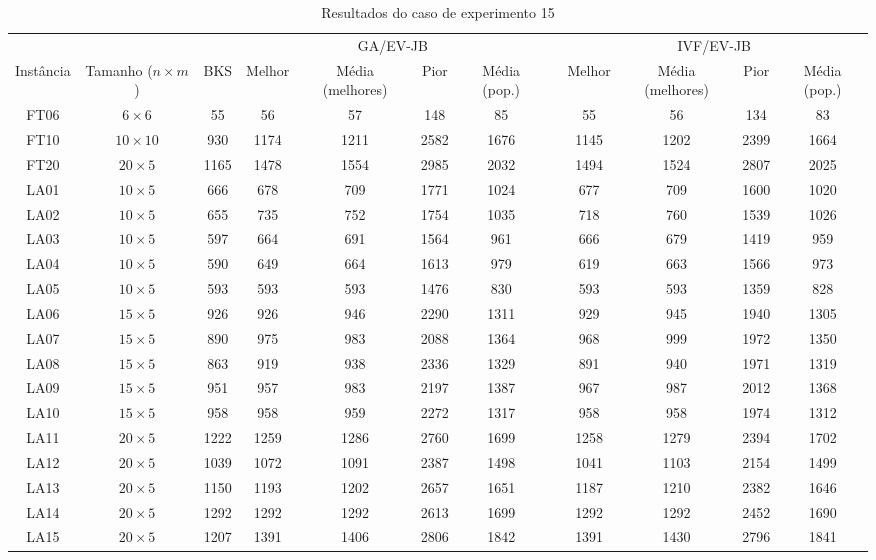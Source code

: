 \begin{sidewaystable}
\caption{Resultados do caso de experimento 15}
\centering
\label{experimento15}
\begin{tabular}{cccccccccccc}
\toprule
& & & \multicolumn{4}{c}{GA/EV-JB} & & \multicolumn{4}{c}{IVF/EV-JB} \\
\cmidrule(c){4-7}
\cmidrule(c){9-12}
Inst\^{a}ncia & Tamanho ($n \times m$) & BKS & Melhor & M\'{e}dia (melhores) & Pior & M\'{e}dia (pop.) & & Melhor & M\'{e}dia (melhores) & Pior & M\'{e}dia (pop.) \\
\midrule
FT06 & $6 \times 6$ & 55 & 56 & 57 & 148 & 85 & & 55 & 56 & 134 & 83 \\
FT10 & $10 \times 10$ & 930 & 1174 & 1211 & 2582 & 1676 & & 1145 & 1202 & 2399 & 1664 \\
FT20 & $20 \times 5$ & 1165 & 1478 & 1554 & 2985 & 2032 & & 1494 & 1524 & 2807 & 2025 \\
LA01 & $10 \times 5$ & 666 & 678 & 709 & 1771 & 1024 & & 677 & 709 & 1600 & 1020 \\
LA02 & $10 \times 5$ & 655 & 735 & 752 & 1754 & 1035 & & 718 & 760 & 1539 & 1026 \\
LA03 & $10 \times 5$ & 597 & 664 & 691 & 1564 & 961 & & 666 & 679 & 1419 & 959 \\
LA04 & $10 \times 5$ & 590 & 649 & 664 & 1613 & 979 & & 619 & 663 & 1566 & 973 \\
LA05 & $10 \times 5$ & 593 & 593 & 593 & 1476 & 830 & & 593 & 593 & 1359 & 828 \\
LA06 & $15 \times 5$ & 926 & 926 & 946 & 2290 & 1311 & & 929 & 945 & 1940 & 1305 \\
LA07 & $15 \times 5$ & 890 & 975 & 983 & 2088 & 1364 & & 968 & 999 & 1972 & 1350 \\
LA08 & $15 \times 5$ & 863 & 919 & 938 & 2336 & 1329 & & 891 & 940 & 1971 & 1319 \\
LA09 & $15 \times 5$ & 951 & 957 & 983 & 2197 & 1387 & & 967 & 987 & 2012 & 1368 \\
LA10 & $15 \times 5$ & 958 & 958 & 959 & 2272 & 1317 & & 958 & 958 & 1974 & 1312 \\
LA11 & $20 \times 5$ & 1222 & 1259 & 1286 & 2760 & 1699 & & 1258 & 1279 & 2394 & 1702 \\
LA12 & $20 \times 5$ & 1039 & 1072 & 1091 & 2387 & 1498 & & 1041 & 1103 & 2154 & 1499 \\
LA13 & $20 \times 5$ & 1150 & 1193 & 1202 & 2657 & 1651 & & 1187 & 1210 & 2382 & 1646 \\
LA14 & $20 \times 5$ & 1292 & 1292 & 1292 & 2613 & 1699 & & 1292 & 1292 & 2452 & 1690 \\
LA15 & $20 \times 5$ & 1207 & 1391 & 1406 & 2806 & 1842 & & 1391 & 1430 & 2796 & 1841 \\
\bottomrule
\end{tabular}
\end{sidewaystable}
